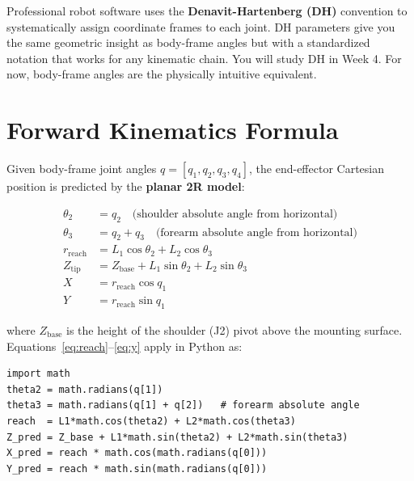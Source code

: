 \documentclass[11pt,a4paper]{article}
\begin{document}
\begin{tcolorbox}[infobox, title={DH Convention (coming in Week 4)}]
  Professional robot software uses the \textbf{Denavit-Hartenberg (DH)} convention to
  systematically assign coordinate frames to each joint. DH parameters give you
  the same geometric insight as body-frame angles but with a standardized notation
  that works for any kinematic chain. You will study DH in Week 4. For now,
  body-frame angles are the physically intuitive equivalent.
\end{tcolorbox}

\section{Forward Kinematics Formula}

Given body-frame joint angles $q = [q_1, q_2, q_3, q_4]$, the end-effector
Cartesian position is predicted by the \textbf{planar 2R model}:

\begin{align}
  \theta_2 &= q_2 \quad \text{(shoulder absolute angle from horizontal)} \\
  \theta_3 &= q_2 + q_3 \quad \text{(forearm absolute angle from horizontal)} \\[6pt]
  r_{\text{reach}} &= L_1 \cos\theta_2 + L_2 \cos\theta_3 \label{eq:reach}\\
  Z_{\text{tip}} &= Z_{\text{base}} + L_1 \sin\theta_2 + L_2 \sin\theta_3 \label{eq:z}\\[6pt]
  X &= r_{\text{reach}} \cos q_1 \label{eq:x}\\
  Y &= r_{\text{reach}} \sin q_1 \label{eq:y}
\end{align}

where $Z_{\text{base}}$ is the height of the shoulder (J2) pivot above the
mounting surface. Equations~\eqref{eq:reach}--\eqref{eq:y} apply in Python as:

\begin{lstlisting}[style=PythonStyle]
import math
theta2 = math.radians(q[1])
theta3 = math.radians(q[1] + q[2])   # forearm absolute angle
reach  = L1*math.cos(theta2) + L2*math.cos(theta3)
Z_pred = Z_base + L1*math.sin(theta2) + L2*math.sin(theta3)
X_pred = reach * math.cos(math.radians(q[0]))
Y_pred = reach * math.sin(math.radians(q[0]))
\end{lstlisting}
\end{document}
